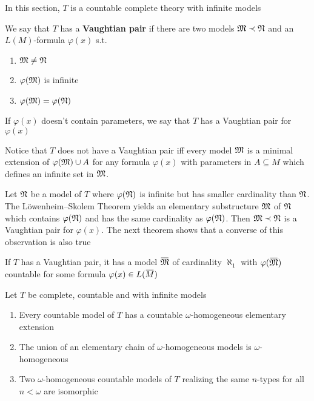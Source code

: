 \documentclass[11pt]{article}
\begin{document}
In this section, \(T\) is a countable complete theory with infinite models

\begin{definition}[]
We say that \(T\) has a \textbf{Vaughtian pair} if there are two models \(\mathfrak{M}\prec\mathfrak{N}\) and
an \(L(M)\)-formula \(\varphi(x)\) s.t.
\begin{enumerate}
\item \(\mathfrak{M}\neq\mathfrak{N}\)
\item \(\varphi(\mathfrak{M})\) is infinite
\item \(\varphi(\mathfrak{M})=\varphi(\mathfrak{N})\)
\end{enumerate}


If \(\varphi(x)\) doesn't contain parameters, we say that \(T\) has a Vaughtian pair for \(\varphi(x)\)
\end{definition}

\begin{remark}
Notice that \(T\) does not have a Vaughtian pair iff every model \(\mathfrak{M}\) is a minimal extension
of \(\varphi(\mathfrak{M})\cup A\) for any formula \(\varphi(x)\) with parameters in \(A\subseteq M\) which defines an infinite
set in \(\mathfrak{M}\).
\end{remark}



Let \(\mathfrak{N}\) be a model of \(T\) where \(\varphi(\mathfrak{N})\) is infinite but has smaller cardinality than \(\mathfrak{N}\).
The Löwenheim–Skolem Theorem yields an elementary substructure \(\mathfrak{M}\) of \(\mathfrak{N}\) which
contains \(\varphi(\mathfrak{N})\) and has the same cardinality as \(\varphi(\mathfrak{N})\). Then \(\mathfrak{M}\prec\mathfrak{N}\) is a Vaughtian pair
for \(\varphi(x)\). The next theorem shows that a converse of this observation is also true

\begin{theorem}
\label{thm5.5.2}
If \(T\) has a Vaughtian pair, it has a model \(\barfM\) of cardinality \(\aleph_1\)
with \(\varphi(\barfM)\) countable for some formula \(\varphi(x)\in L(\barM)\)
\end{theorem}

\begin{lemma}[]
\label{lemma5.5.3}
Let \(T\) be complete, countable and with infinite models
\begin{enumerate}
\item Every countable model of \(T\) has a countable \(\omega\)-homogeneous elementary extension
\item The union of an elementary chain of \(\omega\)-homogeneous models is \(\omega\)-homogeneous
\item Two \(\omega\)-homogeneous countable models of \(T\) realizing the same \(n\)-types for all \(n<\omega\)
are isomorphic
\end{enumerate}
\end{lemma}
\end{document}
